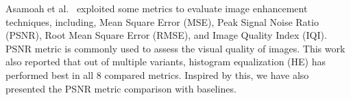 Asamoah et al.~\cite{asamoah2018measuring} exploited some metrics to evaluate image enhancement techniques, including, Mean Square Error (MSE), Peak Signal Noise Ratio (PSNR), Root Mean Square Error (RMSE), and Image Quality Index (IQI). PSNR metric is commonly used to assess the visual quality of images. This work also reported that out of multiple variants, histogram equalization (HE) has performed best in all 8 compared metrics. Inspired by this, we have also presented the PSNR metric comparison with baselines. 

